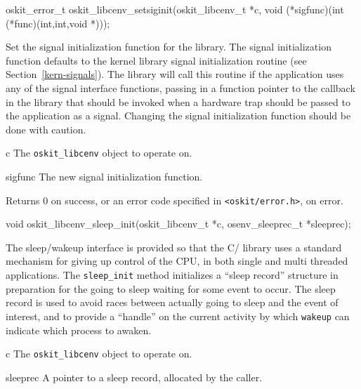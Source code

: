 \begin{apisyn}

	\funcproto oskit_error_t
		   oskit_libcenv_setsiginit(oskit_libcenv_t *c,
				void (*sigfunc)(int (*func)(int,int,void *)));
\end{apisyn}
\begin{apidesc}
	Set the signal initialization function for the \posix{}
	library. The signal initialization function defaults to the
	\oskit{} kernel library signal initialization routine (see
	Section~\ref{kern-signals}). The \posix{} library will call this
	routine if
	the application uses any of the \posix{} signal interface
	functions, passing in a function pointer to the callback in the
	\posix{} library that should be invoked when a hardware trap should
	be passed to the application as a signal.
	Changing the signal initialization function should be done with caution.
\end{apidesc}
\begin{apiparm}
	\item[c]
		The \texttt{oskit_libcenv} object to operate on.
	\item[sigfunc]
		The new signal initialization function.
\end{apiparm}
\begin{apiret}
	Returns 0 on success, or an error code specified in
	{\tt <oskit/error.h>}, on error.
\end{apiret}


\begin{apisyn}

	\funcproto void
		   oskit_libcenv_sleep_init(oskit_libcenv_t *c,
				osenv_sleeprec_t *sleeprec);
\end{apisyn}
\begin{apidesc}
	The sleep/wakeup interface is provided so that the C/\posix{}
	library uses a standard mechanism for giving up control of the CPU,
	in both single and multi threaded applications. The
	\texttt{sleep_init} method initializes a ``sleep record'' structure
	in preparation for the going to sleep waiting for some event to
	occur.  The sleep record is used to avoid races between actually
	going to sleep and the event of interest, and to provide a
	``handle'' on the current activity by which \texttt{wakeup} can
	indicate which process to awaken.
\end{apidesc}
\begin{apiparm}
	\item[c]
		The \texttt{oskit_libcenv} object to operate on.
	\item[sleeprec]
		A pointer to a sleep record, allocated by the caller.
\end{apiparm}


